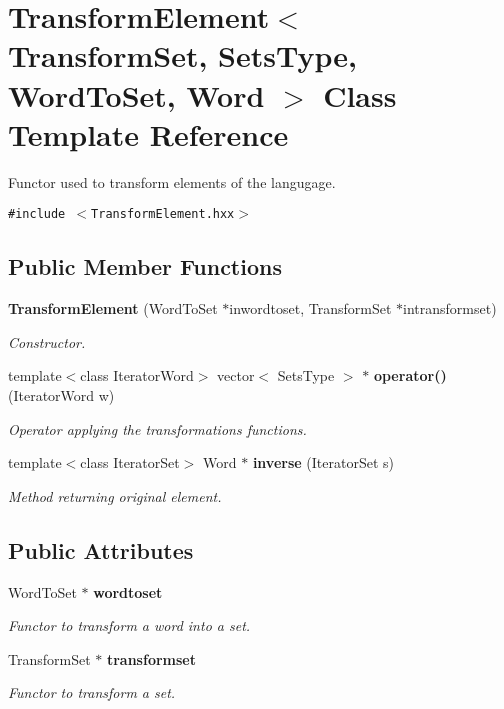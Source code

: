 \section{Transform\-Element$<$ Transform\-Set, Sets\-Type, Word\-To\-Set, Word $>$ Class Template Reference}
\label{class_transform_element}
Functor used to transform elements of the langugage.  


{\tt \#include $<$Transform\-Element.hxx$>$}

\subsection*{Public Member Functions}
\begin{CompactItemize}
\item 
{\bf Transform\-Element} (Word\-To\-Set $\ast$inwordtoset, Transform\-Set $\ast$intransformset)\label{class_transform_element_719623f74be497a502346662d13cf4ef}

\begin{CompactList}\small\item\em Constructor. \item\end{CompactList}\item 
template$<$class Iterator\-Word$>$ vector$<$ Sets\-Type $>$ $\ast$ {\bf operator()} (Iterator\-Word w)
\begin{CompactList}\small\item\em Operator applying the transformations functions. \item\end{CompactList}\item 
template$<$class Iterator\-Set$>$ Word $\ast$ {\bf inverse} (Iterator\-Set s)
\begin{CompactList}\small\item\em Method returning original element. \item\end{CompactList}\end{CompactItemize}
\subsection*{Public Attributes}
\begin{CompactItemize}
\item 
Word\-To\-Set $\ast$ {\bf wordtoset}\label{class_transform_element_2b9cd853fe9bbf27160693c29b7d666c}

\begin{CompactList}\small\item\em Functor to transform a word into a set. \item\end{CompactList}\item 
Transform\-Set $\ast$ {\bf transformset}\label{class_transform_element_1c5bcca50f2850e15b2066da3b7b4305}

\begin{CompactList}\small\item\em Functor to transform a set. \item\end{CompactList}\end{CompactItemize}


